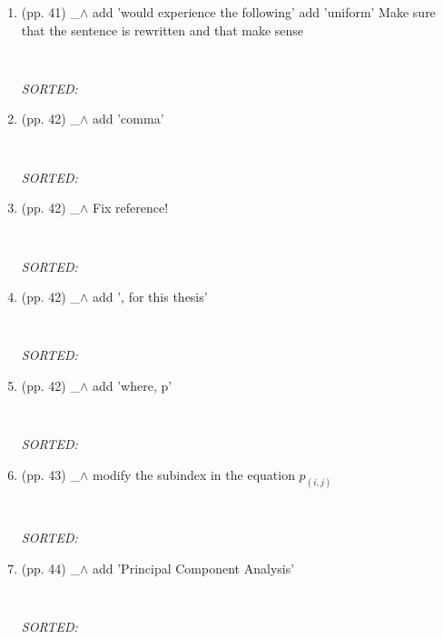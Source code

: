 \documentclass[12pt]{article}
\begin{document}
\begin{enumerate}
\item  (pp. 41)  \_$\wedge$  
	add 'would experience the following'
	add 'uniform'
	Make sure that the sentence is rewritten and
	that make sense
	\begin{verbatim}
	
	\end{verbatim}
	\textit{
	SORTED:  
	}
	\\


\item  (pp. 42)  \_$\wedge$  
	add 'comma'
	\begin{verbatim}
	
	\end{verbatim}
	\textit{
	SORTED:  
	}
	\\


\item  (pp. 42)  \_$\wedge$  
	Fix reference!
	\begin{verbatim}
	
	\end{verbatim}
	\textit{
	SORTED:  
	}
	\\

\item  (pp. 42)  \_$\wedge$  
	add ', for this thesis'
	\begin{verbatim}
	
	\end{verbatim}
	\textit{
	SORTED:  
	}
	\\

\item  (pp. 42)  \_$\wedge$  
	add 'where, p'
	\begin{verbatim}
	
	\end{verbatim}
	\textit{
	SORTED:  
	}
	\\


\item  (pp. 43)  \_$\wedge$  
	modify the subindex in the equation $p_{(i,j)}$
	\begin{verbatim}
	
	\end{verbatim}
	\textit{
	SORTED:  
	}
	\\

\item  (pp. 44)  \_$\wedge$  
	add 'Principal Component Analysis'
	\begin{verbatim}
	
	\end{verbatim}
	\textit{
	SORTED:  
	}
	\\


\end{enumerate}
\end{document}
